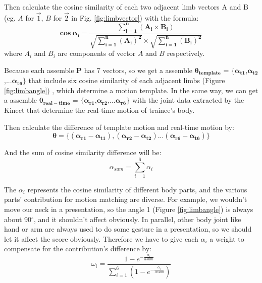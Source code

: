 \par Then calculate the cosine similarity of each two adjacent limb vectors A and B (eg. $A$ for $\vec 1$, $B$ for $\vec 2$ in Fig. \ref{fig:limbvector}) with the formula:
\begin{equation}
  \bm{cos} \ \bm{ \alpha_{i}} = \bm{\frac{\sum_{i =1}^{n}(A_{i}\times B_{i})}{\sqrt{\sum_{i=1}^{n}(A_{i})^{2}}\times \sqrt{\sum_{i=1}^{n}(B_{i})^{2}}}}
\label{cos}
\end{equation}
where $A_i$ and $B_i$ are components of vector $A$ and $B$ respectively.

\par Because each assemble $\bm{P}$ has 7 vectors, so we get a assemble $\bm{\theta_{template}}$ = $\lbrace\bm{\alpha_{t1}}$,$\bm{\alpha_{t2}}$,...$\bm{\alpha_{t6}}\rbrace$ that include six cosine similarity of each adjacent limbs (Figure \ref{fig:limbangle}) , which determine a motion template. In the same way, we can get a assemble $\bm{\theta_{real-time}}$ = $\lbrace\bm{\alpha_{r1}}$,$\bm{\alpha_{r2}}$,...$\bm{\alpha_{r6}}\rbrace$ with the joint data extracted by the Kinect that determine the real-time motion of trainee's body. 
\par Then calculate the difference of template motion and real-time motion by:
\begin{equation}
		\bm {\theta=\lbrace (\alpha_{r1}-\alpha_{t1}),(\alpha_{r2}-\alpha_{t2})...(\alpha_{r6}-\alpha_{t6})   \rbrace}
\label{difference}
\end{equation}
\par And the sum of cosine similarity difference will be:
\begin{equation}
\alpha _{sum} = \sum_{i=1}^{6}\alpha_{i}
\label{sum}
\end{equation}

\par The $\alpha_{i}$ represents the cosine similarity of different body parts, and the various parts' contribution for motion matching are diverse. For example, we wouldn't move our neck in a presentation, so the angle 1 (Figure \ref{fig:limbangle}) is always about 90$^\circ$, and it shouldn't affect obviously. In parallel, other body joint like hand or arm are always used to do some gesture in a presentation, so we should let it affect the score obviously. Therefore we have to give each $\alpha_{i}$ a weight to compensate for the contribution's difference by:
\begin{equation}
  \omega_{i} = \frac{1-e^{-\frac{\alpha_{i}}{\alpha{sum}}}}{\sum_{i=1}^{6}(1-e^{-\frac{\alpha_{i}}{\alpha{sum}}})}	
\label{weight}
\end{equation}

